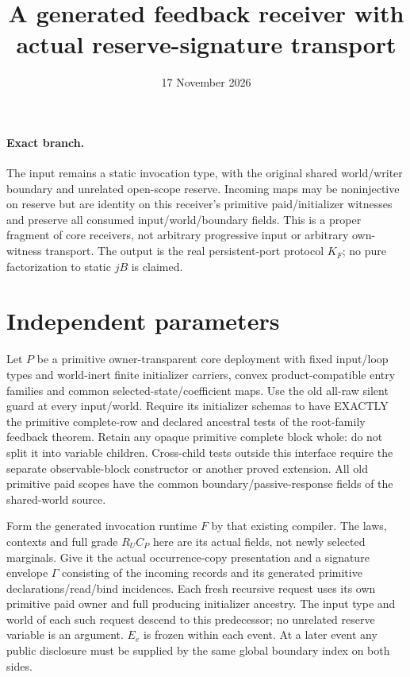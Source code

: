 \documentclass[11pt]{article}
\title{A generated feedback receiver with actual reserve-signature transport}
\date{17 November 2026}
\begin{document}
\maketitle
\paragraph{Exact branch.} The input remains a static invocation type, with the original shared world/writer boundary and unrelated open-scope reserve. Incoming maps may be noninjective on reserve but are identity on this receiver's primitive paid/initializer witnesses and preserve all consumed input/world/boundary fields. This is a proper fragment of core receivers, not arbitrary progressive input or arbitrary own-witness transport. The output is the real persistent-port protocol $K_F$; no pure factorization to static $jB$ is claimed.

\section{Independent parameters}
Let $P$ be a primitive owner-transparent core deployment with fixed input/loop types and world-inert finite initializer carriers, convex product-compatible entry families and common selected-state/coefficient maps. Use the old all-raw silent guard at every input/world. Require its initializer schemas to have EXACTLY the primitive complete-row and declared ancestral tests of the root-family feedback theorem. Retain any opaque primitive complete block whole: do not split it into variable children. Cross-child tests outside this interface require the separate observable-block constructor or another proved extension. All old primitive paid scopes have the common boundary/passive-response fields of the shared-world source.

Form the generated invocation runtime $F$ by that existing compiler. The laws, contexts and full grade $R_UC_P$ here are its actual fields, not newly selected marginals. Give it the actual occurrence-copy presentation and a signature envelope $\Gamma$ consisting of the incoming records and its generated primitive declarations/read/bind incidences. Each fresh recursive request uses its own primitive paid owner and full producing initializer ancestry. The input type and world of each such request descend to this predecessor; no unrelated reserve variable is an argument. $E_e$ is frozen within each event. At a later event any public disclosure must be supplied by the same global boundary index on both sides.
\end{document}

